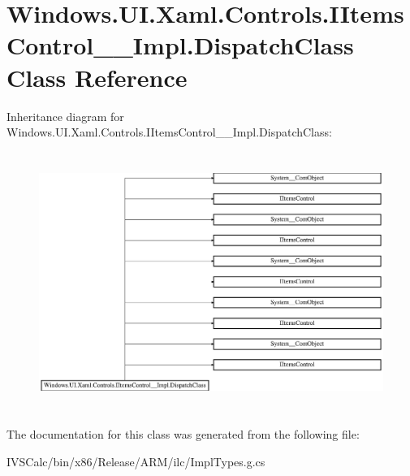 \hypertarget{class_windows_1_1_u_i_1_1_xaml_1_1_controls_1_1_i_items_control_____impl_1_1_dispatch_class}{}\section{Windows.\+U\+I.\+Xaml.\+Controls.\+I\+Items\+Control\+\_\+\+\_\+\+Impl.\+Dispatch\+Class Class Reference}
\label{class_windows_1_1_u_i_1_1_xaml_1_1_controls_1_1_i_items_control_____impl_1_1_dispatch_class}
Inheritance diagram for Windows.\+U\+I.\+Xaml.\+Controls.\+I\+Items\+Control\+\_\+\+\_\+\+Impl.\+Dispatch\+Class\+:\begin{figure}[H]
\begin{center}
\leavevmode
\includegraphics[height=8.461538cm]{class_windows_1_1_u_i_1_1_xaml_1_1_controls_1_1_i_items_control_____impl_1_1_dispatch_class}
\end{center}
\end{figure}


The documentation for this class was generated from the following file\+:\begin{DoxyCompactItemize}
\item 
I\+V\+S\+Calc/bin/x86/\+Release/\+A\+R\+M/ilc/Impl\+Types.\+g.\+cs\end{DoxyCompactItemize}
